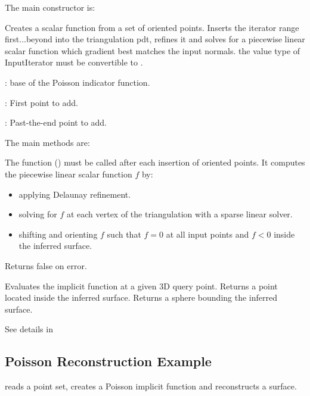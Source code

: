 The main constructor is:

{
Creates a scalar function from a set of oriented points. Inserts the iterator range first...beyond into the triangulation pdt, refines it and solves for a piecewise linear scalar function which gradient best matches the input normals.
\ccPrecond the value type of InputIterator must be convertible to .
\begin{description}
\item {}:  base of the Poisson indicator function. \item {}: First point to add. \item {}: Past-the-end point to add. \end{description}
}

The main methods are:

{
The function () must be called after each insertion of oriented points. It computes the piecewise linear scalar function $f$ by:
\begin{itemize}
\item applying Delaunay refinement.
\item solving for $f$ at each vertex of the triangulation with a sparse linear solver.
\item shifting and orienting $f$ such that $f=0$ at all input points and $f<0$ inside the inferred surface.
\end{itemize}
Returns false on error.
}
\ccGlue
{}
{
Evaluates the implicit function at a given 3D query point.
}
\ccGlue
{}
{
Returns a point located inside the inferred surface.
}
{
Returns a sphere bounding the inferred surface.
}

See details in \\


\subsection{Poisson Reconstruction Example}

 reads a point set, creates a Poisson implicit function and reconstructs a surface.



